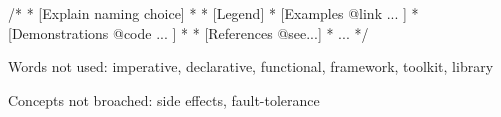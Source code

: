 \documentclass{article}
\begin{document}
/*
 * [Explain naming choice]
 *
 * [Legend]
 *		[Examples {@link} ... ]
 *			[Demonstrations {@code} ... ]
 *
 * [References @see...]
 * ...
 */

Words not used:
imperative, declarative, functional, framework, toolkit, library

Concepts not broached:
side effects, fault-tolerance
\end{document}
